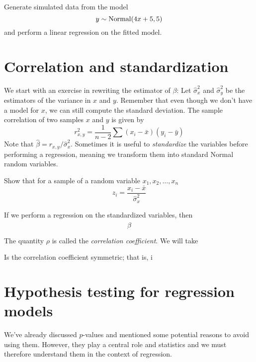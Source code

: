 \begin{example} Generate simulated data from the model
\begin{equation}
y \sim {\rm Normal}(4x + 5,5)
\end{equation} 
and perform a linear regression on the fitted model. 
\end{example}


\section{Correlation and standardization}

We start with an exercise in rewriting the estimator of $\beta$: 
Let $\hat{\sigma}_x^2$ and $\hat{\sigma}_y^2$ be the estimators of the variance in $x$ and $y$. Remember that even though we don't have a model for $x$, we can still compute the standard deviation. The sample correlation of two samples $x$ and $y$ is given by 
\begin{equation}
r_{x,y}^2 = \frac{1}{n-2}\sum (x_i - \bar{x})(y_i - \bar{y})
\end{equation}
Note that $\hat{\beta} = r_{x,y}/\hat{\sigma}_x^2$. Sometimes it is useful to \emph{standardize} the variables before performing a regression, meaning we transform them into standard Normal random variables. 
 \begin{exercise}  Show that for a sample of a random variable $x_1,x_2,\dots,x_n$
 \begin{equation}
 z_i = \frac{x_i - \bar{x}}{\hat{\sigma}_x^2}
 \end{equation}
\end{exercise}

If we perform a regression on the standardized variables, then 
\begin{equation}
\hat{\beta} 
\end{equation}

The quantity $\rho$ is called the \emph{correlation coefficient}. 
We will take 

\begin{exercise} Is the correlation coefficient symmetric; that is, i
\end{exercise}


\section{Hypothesis testing for regression models}
We've already discussed $p$-values and mentioned some potential reasons to avoid using them. However, they play a central role and statistics and we must therefore understand them in the context of regression. 

